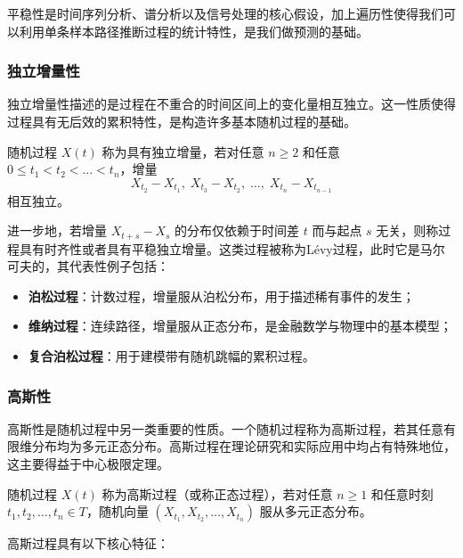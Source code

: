 平稳性是时间序列分析、谱分析以及信号处理的核心假设，加上遍历性使得我们可以利用单条样本路径推断过程的统计特性，是我们做预测的基础。

\subsubsection{独立增量性}

独立增量性描述的是过程在不重合的时间区间上的变化量相互独立。这一性质使得过程具有无后效的累积特性，是构造许多基本随机过程的基础。

\begin{definition}[独立增量]
随机过程 \(X(t)\) 称为具有独立增量，若对任意 \(n \ge 2\) 和任意 \(0 \le t_1 < t_2 < \dots < t_n\)，增量
\[
X_{t_2} - X_{t_1},\; X_{t_3} - X_{t_2},\; \ldots,\; X_{t_n} - X_{t_{n-1}}
\]
相互独立。
\end{definition}

进一步地，若增量 \(X_{t+s} - X_s\) 的分布仅依赖于时间差 \(t\) 而与起点 \(s\) 无关，则称过程具有时齐性或者具有平稳独立增量。这类过程被称为Lévy过程，此时它是马尔可夫的，其代表性例子包括：

\begin{itemize}
    \item \textbf{泊松过程}：计数过程，增量服从泊松分布，用于描述稀有事件的发生；
    \item \textbf{维纳过程}：连续路径，增量服从正态分布，是金融数学与物理中的基本模型；
    \item \textbf{复合泊松过程}：用于建模带有随机跳幅的累积过程。
\end{itemize}

\subsubsection{高斯性}

高斯性是随机过程中另一类重要的性质。一个随机过程称为高斯过程，若其任意有限维分布均为多元正态分布。高斯过程在理论研究和实际应用中均占有特殊地位，这主要得益于中心极限定理。

\begin{definition}[高斯过程]
随机过程 \(X(t)\) 称为高斯过程（或称正态过程），若对任意 \(n \ge 1\) 和任意时刻 \(t_1, t_2, \dots, t_n \in T\)，随机向量 \((X_{t_1}, X_{t_2}, \dots, X_{t_n})\) 服从多元正态分布。
\end{definition}

高斯过程具有以下核心特征：

